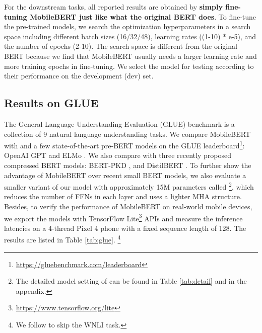 \documentclass[11pt,a4paper]{article}
\begin{document}
For the downstream tasks, all reported results are obtained by \textbf{simply fine-tuning 
MobileBERT just like what the original BERT does}. To fine-tune the pre-trained models, we search the optimization hyperparameters in a search space including different batch sizes (16/32/48), learning rates ((1-10) * e-5), and the number of epochs (2-10). The search space is different from the original BERT because we find that MobileBERT usually needs a larger learning rate and more training epochs in fine-tuning. We select the model for testing according to their performance on the development (dev) set.


\subsection{Results on GLUE}

The General Language Understanding Evaluation (GLUE) benchmark \citep{wang2018glue} is a collection of 9 natural language understanding tasks.
We compare MobileBERT with  and a few state-of-the-art pre-BERT models on the GLUE leaderboard\footnote{\url{https://gluebenchmark.com/leaderboard}}: OpenAI GPT \citep{radford2018improving} and ELMo \citep{peters2018deep}. We also compare with three recently proposed compressed BERT models: BERT-PKD \citep{sun2019patient}, and DistilBERT \cite{sanh2019distilbert}.
To further show the advantage of MobileBERT over recent small BERT models, we also evaluate a smaller variant of our model with approximately 15M parameters called \footnote{The detailed model setting of  can be found in Table \ref{tab:detail} and in the appendix.}, which reduces the number of FFNs in each layer and uses a lighter MHA structure.
Besides, to verify the performance of MobileBERT on real-world mobile devices, we export the models with TensorFlow Lite\footnote{\url{https://www.tensorflow.org/lite}} APIs and measure the inference latencies on a 4-thread Pixel 4 phone with a fixed sequence length of 128. The results are listed in Table \ref{tab:glue}.
\footnote{We follow \citet{devlin2018bert} to skip the WNLI task. }

\setlength{\tabcolsep}{2pt}
\end{document}
